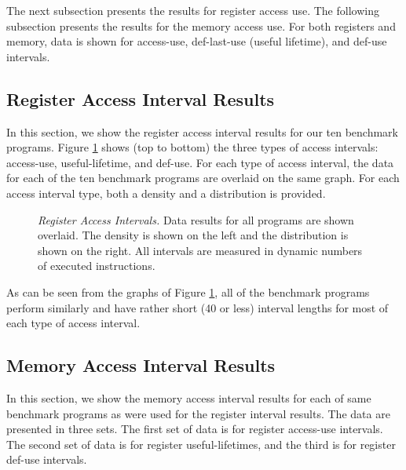 \documentclass[10pt,dvips]{article}
\begin{document}
The next subsection presents the results for register access use.
The following subsection presents the results for the memory 
access use.  For both registers and memory, data is shown for 
access-use, def-last-use (useful lifetime), and def-use
intervals.
%
%
\subsection{Register Access Interval Results}
%
In this section, we show the register access interval results for
our ten benchmark programs.
Figure \ref{fig:a_over} shows (top to bottom)
the three types of access intervals:
access-use, useful-lifetime, and def-use.
For each type of access interval, the data for each of the
ten benchmark programs are overlaid on the same graph.
For each access interval type, both a density 
and a distribution is provided.
%
\begin{figure}[tb]
\centering
{}
\caption{{\em Register Access Intervals.} 
Data results for all programs are shown overlaid.
The density is shown on the left and the distribution is shown
on the right.
All intervals are measured in dynamic numbers of executed instructions.}
\label{fig:a_over}
\end{figure}
%
As can be seen from the graphs of Figure \ref{fig:a_over},
all of the benchmark programs perform similarly and have
rather short (40 or less) interval lengths for most of each type
of access interval.
%
%
\subsection{Memory Access Interval Results}
%
In this section, we show the memory access interval results for
each of same benchmark programs as were used for the register interval
results.
The data are presented in three sets.
The first set of data is for register access-use intervals.
The second set of data is for register useful-lifetimes, and
the third is for register def-use intervals.
\end{document}
